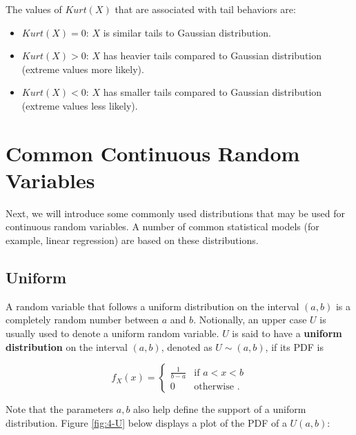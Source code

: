 \documentclass[
]{book}
\providecommand{\tightlist}{%
  \setlength{\itemsep}{0pt}\setlength{\parskip}{0pt}}
\begin{document}
The values of \(Kurt(X)\) that are associated with tail behaviors are:

\begin{itemize}
\tightlist
\item
  \(Kurt(X) = 0\): \(X\) is similar tails to Gaussian distribution.
\item
  \(Kurt(X) > 0\): \(X\) has heavier tails compared to Gaussian distribution (extreme values more likely).
\item
  \(Kurt(X) < 0\): \(X\) has smaller tails compared to Gaussian distribution (extreme values less likely).
\end{itemize}

\section{Common Continuous Random Variables}\label{common-continuous-random-variables}

Next, we will introduce some commonly used distributions that may be used for continuous random variables. A number of common statistical models (for example, linear regression) are based on these distributions.

\subsection{Uniform}\label{uniform}

A random variable that follows a uniform distribution on the interval \((a,b)\) is a completely random number between \(a\) and \(b\). Notionally, an upper case \(U\) is usually used to denote a uniform random variable. \(U\) is said to have a \textbf{uniform distribution} on the interval \((a,b)\), denoted as \(U \sim(a,b)\), if its PDF is

\begin{equation} 
f_X(x) = \begin{cases} 
  \frac{1}{b-a} & \text{if } a<x<b \\
  0 & \text{otherwise }. 
\end{cases}
\label{eq:4-U}
\end{equation}

Note that the parameters \(a,b\) also help define the support of a uniform distribution. Figure \ref{fig:4-U} below displays a plot of the PDF of a \(U(a,b)\):
\end{document}

